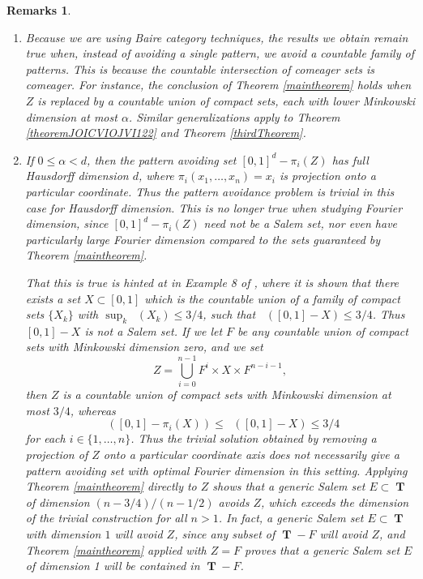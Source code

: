 \documentclass[dvipsnames,letterpaper,12pt]{article}
\numberwithin{equation}{section}
\DeclareMathOperator{\minkdim}{\dim_{\mathbf{M}}}
\DeclareMathOperator{\fordim}{\dim_{\mathbf{F}}}
\DeclareMathOperator{\TT}{\mathbf{T}}
\newtheorem{remarks}[theorem]{Remarks}
\numberwithin{theorem}{section}
\begin{document}
\begin{remarks}
    \ 
    \begin{enumerate}
        \item Because we are using Baire category techniques, the results we obtain remain true when, instead of avoiding a single pattern, we avoid a countable family of patterns. This is because the countable intersection of comeager sets is comeager. For instance, the conclusion of Theorem \ref{maintheorem} holds when $Z$ is replaced by a \emph{countable union} of compact sets, each with lower Minkowski dimension at most $\alpha$. Similar generalizations apply to Theorem \ref{theoremJOICVIOJVI122} and Theorem \ref{thirdTheorem}.

        \item If $0 \leq \alpha < d$, then the pattern avoiding set $[0,1]^d - \pi_i(Z)$ has full Hausdorff dimension $d$, where $\pi_i(x_1,\dots,x_n) = x_i$ is projection onto a particular coordinate. Thus the pattern avoidance problem is trivial in this case for Hausdorff dimension. This is no longer true when studying Fourier dimension, since $[0,1]^d - \pi_i(Z)$ need not be a Salem set, nor even have particularly large Fourier dimension compared to the sets guaranteed by Theorem \ref{maintheorem}.

        That this is true is hinted at in Example 8 of \cite{Ekstrom2014}, where it is shown that there exists a set $X \subset [0,1]$ which is the countable union of a family of compact sets $\{ X_k \}$ with $\sup_k \minkdim(X_k) \leq 3/4$, such that $\fordim([0,1] - X) \leq 3/4$. Thus $[0,1] - X$ is not a Salem set. If we let $F$ be any countable union of compact sets with Minkowski dimension zero, and we set
        \[ Z = \bigcup_{i = 0}^{n-1} F^i \times X \times F^{n-i-1}, \]
        then $Z$ is a countable union of compact sets with Minkowski dimension at most $3/4$, whereas
        \[ \fordim([0,1] - \pi_i(X)) \leq \fordim([0,1] - X) \leq 3/4 \]
        for each $i \in \{ 1, \dots, n \}$. Thus the trivial solution obtained by removing a projection of $Z$ onto a particular coordinate axis does not necessarily give a pattern avoiding set with optimal Fourier dimension in this setting. Applying Theorem \ref{maintheorem} directly to $Z$ shows that a generic Salem set $E \subset \TT$ of dimension $(n-3/4)/(n-1/2)$ avoids $Z$, which exceeds the dimension of the trivial construction for all $n > 1$. In fact, a generic Salem set $E \subset \TT$ with dimension $1$ will avoid $Z$, since any subset of $\TT - F$ will avoid $Z$, and Theorem \ref{maintheorem} applied with $Z = F$ proves that a generic Salem set $E$ of dimension 1 will be contained in $\TT - F$.


\end{enumerate}
\end{remarks}
\end{document}
